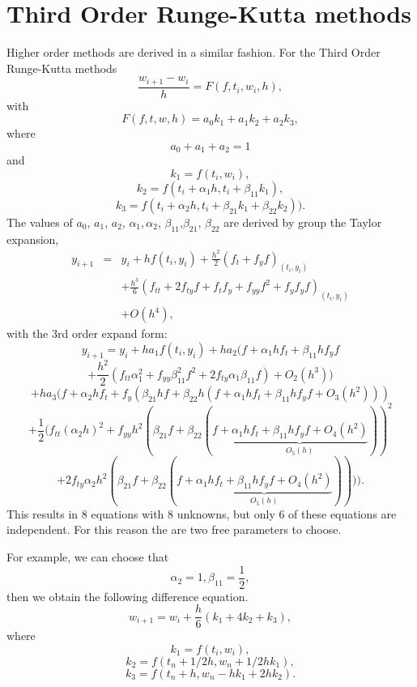\section{Third Order Runge-Kutta methods}
Higher order methods are derived in a similar fashion.
For the Third Order Runge-Kutta methods 
\begin{equation}
\frac{w_{i+1}-w_i}{h}=F(f,t_i,w_i,h),
\end{equation}
with
\begin{equation}
F(f,t,w,h)=a_0k_1+a_1k_2+a_2k_3,
\end{equation}
where 
\[a_0+a_1+a_2=1\] 
and
\[k_1=f(t_i,w_i),\]
\[k_2=f(t_i+\alpha_1h,t_i+\beta_{11}k_1),\]
\[k_3=f(t_i+\alpha_2h,t_i+\beta_{21}k_1+\beta_{22}k_2)).\]
The values of $a_0$, $a_1$, $a_2$, $\alpha_1,\alpha_2$, $\beta_{11}$,$\beta_{21}$, $\beta_{22}$ are derived by group the Taylor expansion,
\begin{eqnarray*} y_{i+1}&=&y_{i}+hf(t_{i},y_{i})+{\frac {h^{2}}{2}}(f_{t}+f_{y}f)_{(t_{i},y_{i})}\\
& &+{\frac {h^{3}}{6}}\left(f_{tt}+2f_{ty}f+f_{t}f_{y}+f_{yy}f^{2}+f_{y}f_{y}f\right)_{(t_{i},y_{i})}\\
& &+O(h^{4}),\end{eqnarray*}
with the 3rd order expand form:
\[ y_{i+1}=y_{i}+ha_{1}f(t_{i},y_{i})+ha_{2}(f+\alpha_{1}hf_{t}+\beta_{11}hf_{y}f\]\[+{\frac {h^{2}}{2}}(f_{tt}\alpha_{1}^{2}+f_{yy}\beta_{11}^{2}f^{2}+2f_{ty}\alpha_{1}\beta_{11}f)+O_{2}(h^{3}))\]
\[+ha_{3}(f+\alpha_{2}hf_{t}+f_{y}\left(\beta_{21}hf+\beta_{22}h(f+\alpha_{1}hf_{t}+\beta_{11}hf_{y}f+O_{3}(h^{2}))\right)\] 
\[+{\frac {1}{2}}(f_{tt}(\alpha_{2}h)^{2}+f_{yy}h^{2}(\beta_{21}f+ \beta_{22}(f+\underbrace {\alpha_{1}hf_{t}+\beta_{11}hf_{y}f+O_{4}(h^{2})} _{O_{5}(h)}))^{2}\]
 \[+2f_{ty}\alpha_{2}h^{2}(\beta_{21}f+\beta_{22}(f+\underbrace {\alpha_{1}hf_{t}+\beta_{11}hf_{y}f+O_{4}(h^{2})} _{O_{5}(h)})))).\]
 This results in 8 equations with 8 unknowns, but only 6 of these equations are independent. For this reason the are two free parameters to choose.

For example, we can choose that \[\alpha_{2}=1,\beta_{11}=\frac{1}{2},\]then we obtain the following difference equation.
\[ w_{i+1}=w_{i}+{\frac {h}{6}}(k_{1}+4k_{2}+k_{3}),\]
where
\[k_{1}=f(t_{i},w_{i}),\]
\[ k_{2}=f(t_{n}+1/2h,w_{n}+1/2hk_{1}),\]
\[ k_{3}=f(t_{n}+h,w_{n}-hk_{1}+2hk_{2}).\]

